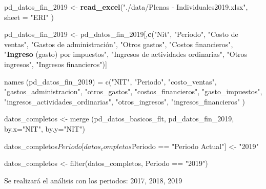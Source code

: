 \documentclass[
  11pt,
  a4paper,
]{book}
\newenvironment{Shaded}{\begin{snugshade}}{\end{snugshade}}
\newcommand{\DataTypeTok}[1]{\textcolor[rgb]{0.13,0.29,0.53}{#1}}
\newcommand{\DecValTok}[1]{\textcolor[rgb]{0.00,0.00,0.81}{#1}}
\newcommand{\KeywordTok}[1]{\textcolor[rgb]{0.13,0.29,0.53}{\textbf{#1}}}
\newcommand{\NormalTok}[1]{#1}
\newcommand{\StringTok}[1]{\textcolor[rgb]{0.31,0.60,0.02}{#1}}
\begin{document}
\begin{Shaded}
\begin{Highlighting}[]
\NormalTok{pd_datos_fin_}\DecValTok{2019}\NormalTok{ <-}\StringTok{ }\KeywordTok{read_excel}\NormalTok{(}\StringTok{"./data/Plenas - Individuales2019.xlsx"}\NormalTok{,}
                                \DataTypeTok{sheet =} \StringTok{"ERI"}\NormalTok{ )}

\NormalTok{pd_datos_fin_}\DecValTok{2019}\NormalTok{ <-}\StringTok{ }\NormalTok{pd_datos_fin_}\DecValTok{2019}\NormalTok{[,}\KeywordTok{c}\NormalTok{(}\StringTok{"Nit"}\NormalTok{, }\StringTok{"Periodo"}\NormalTok{, }\StringTok{"Costo de ventas"}\NormalTok{, }
  \StringTok{"Gastos de administración", "}\NormalTok{Otros gastos}\StringTok{", "}\NormalTok{Costos financieros}\StringTok{", }
\StringTok{  "}\KeywordTok{Ingreso}\NormalTok{ (gasto) por impuestos}\StringTok{", "}\NormalTok{Ingresos de actividades ordinarias}\StringTok{", }
\StringTok{  "}\NormalTok{Otros ingresos}\StringTok{", "}\NormalTok{Ingresos financieros}\StringTok{")]}

\StringTok{names (pd_datos_fin_2019) = c("}\NormalTok{NIT}\StringTok{", "}\NormalTok{Periodo}\StringTok{", "}\NormalTok{costo_ventas}\StringTok{", }
\StringTok{  "}\NormalTok{gastos_administracion}\StringTok{", "}\NormalTok{otros_gastos}\StringTok{", "}\NormalTok{costos_financieros}\StringTok{", }
\StringTok{  "}\NormalTok{gasto_impuestos}\StringTok{", "}\NormalTok{ingresos_actividades_ordinarias}\StringTok{", "}\NormalTok{otros_ingresos}\StringTok{",}
\StringTok{  "}\NormalTok{ingresos_financieros}\StringTok{" )}

\StringTok{datos_completos <- merge (pd_datos_basicos_flt, pd_datos_fin_2019,}
\StringTok{                          by.x="}\NormalTok{NIT}\StringTok{", by.y="}\NormalTok{NIT}\StringTok{")}

\StringTok{datos_completos$Periodo[datos_completos$Periodo == "}\NormalTok{Periodo Actual}\StringTok{"] <- "}\DecValTok{2019}\StringTok{"}

\StringTok{datos_completos <- filter(datos_completos, Periodo == "}\DecValTok{2019}\StringTok{")}
\end{Highlighting}
\end{Shaded}

Se realizará el análisis con los periodos: 2017, 2018, 2019
\end{document}
